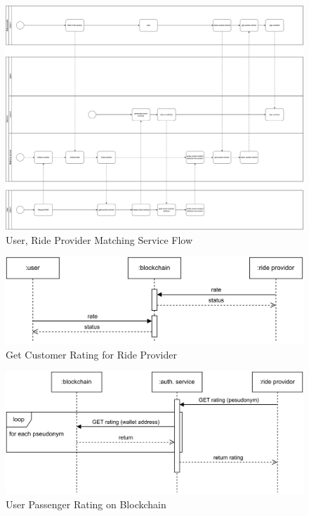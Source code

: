 \begin{figure}
    \centering
    \includegraphics[width=\linewidth]{data/5.svg}
    \caption{User, Ride Provider Matching Service Flow}
    \label{fig:directSVG}
\end{figure}







\begin{figure}
    \centering
    \includegraphics[width=\linewidth]{data/6.svg}
    \caption{Get Customer Rating for Ride Provider}
    \label{fig:directSVG}
\end{figure}







\begin{figure}
    \centering
    \includegraphics[width=\linewidth]{data/7.svg}
    \caption{User Passenger Rating on Blockchain}
    \label{fig:directSVG}
\end{figure}







